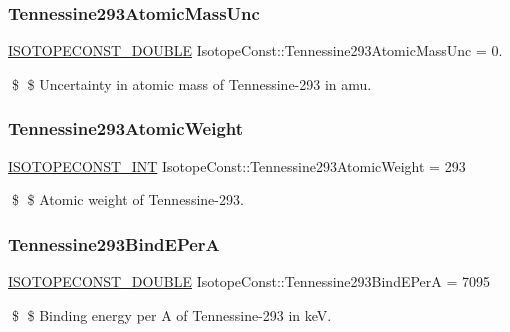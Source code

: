 \subsubsection{\texorpdfstring{Tennessine293\+Atomic\+Mass\+Unc}{Tennessine293AtomicMassUnc}}
{\footnotesize\ttfamily \mbox{\hyperlink{group___isotope_const-_macros_ga8f45a7272ce02c0b4c65c44636ed719a}{I\+S\+O\+T\+O\+P\+E\+C\+O\+N\+S\+T\+\_\+\+D\+O\+U\+B\+LE}} Isotope\+Const\+::\+Tennessine293\+Atomic\+Mass\+Unc = 0.}

\$ \$ Uncertainty in atomic mass of Tennessine-\/293 in amu. \mbox{\label{group___isotope_const-_tennessine-_ts293_ga242c2394fca78d913f42c3343ea989b5}} 
\subsubsection{\texorpdfstring{Tennessine293\+Atomic\+Weight}{Tennessine293AtomicWeight}}
{\footnotesize\ttfamily \mbox{\hyperlink{group___isotope_const-_macros_ga5f18360b3e99483a35c32d789e62621c}{I\+S\+O\+T\+O\+P\+E\+C\+O\+N\+S\+T\+\_\+\+I\+NT}} Isotope\+Const\+::\+Tennessine293\+Atomic\+Weight = 293}

\$ \$ Atomic weight of Tennessine-\/293. \mbox{\label{group___isotope_const-_tennessine-_ts293_ga6e8110394bb18fa646bf49ec59828989}} 
\subsubsection{\texorpdfstring{Tennessine293\+Bind\+E\+PerA}{Tennessine293BindEPerA}}
{\footnotesize\ttfamily \mbox{\hyperlink{group___isotope_const-_macros_ga8f45a7272ce02c0b4c65c44636ed719a}{I\+S\+O\+T\+O\+P\+E\+C\+O\+N\+S\+T\+\_\+\+D\+O\+U\+B\+LE}} Isotope\+Const\+::\+Tennessine293\+Bind\+E\+PerA = 7095}

\$ \$ Binding energy per A of Tennessine-\/293 in keV. \mbox{\label{group___isotope_const-_tennessine-_ts293_ga535a665d2252c78ce07b403fc702f2f7}} 
